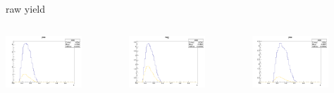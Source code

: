 \begin{frame}{raw yield}
\begin{columns}
\begin{column}[T]{0.25\textwidth}
\includegraphics[width = 0.7\textwidth]{results/yield/statistics/yield_x_Q2_z_0.60_5.500_0.45_pos.png}
\end{column}
\begin{column}[T]{0.25\textwidth}
\includegraphics[width = 0.7\textwidth]{results/yield/statistics/yield_x_Q2_z_0.60_5.500_0.45_neg.png}
\end{column}
\begin{column}[T]{0.25\textwidth}
\includegraphics[width = 0.7\textwidth]{results/yield/statistics/yield_x_Q2_z_0.60_5.500_0.55_pos.png}

\end{column}
\end{columns}
\end{frame}
